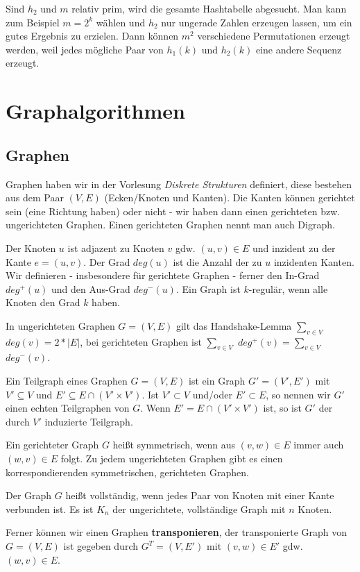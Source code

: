 \documentclass[12pt]{article}
\begin{document}
Sind $h_2$ und $m$ relativ prim, wird die gesamte Hashtabelle abgesucht. Man kann zum Beispiel $m = 2^k$ wählen und $h_2$ nur ungerade Zahlen erzeugen lassen, um ein gutes Ergebnis zu erzielen. Dann können $m^2$ verschiedene Permutationen erzeugt werden, weil jedes mögliche Paar von $h_1(k)$ und $h_2(k)$ eine andere Sequenz erzeugt.

\section{Graphalgorithmen}

\subsection{Graphen}

Graphen haben wir in der Vorlesung \textit{Diskrete Strukturen} definiert, diese bestehen aus dem Paar $(V, E)$ (Ecken/Knoten und Kanten). Die Kanten können gerichtet sein (eine Richtung haben) oder nicht - wir haben dann einen gerichteten bzw. ungerichteten Graphen. Einen gerichteten Graphen nennt man auch Digraph.

Der Knoten $u$ ist adjazent zu Knoten $v$ gdw. $(u,v) \in E$ und inzident zu der Kante $e = (u,v)$. Der Grad $deg(u)$ ist die Anzahl der zu $u$ inzidenten Kanten. Wir definieren - insbesondere für gerichtete Graphen - ferner den In-Grad $deg^+(u)$ und den Aus-Grad $deg^-(u)$. Ein Graph ist $k$-regulär, wenn alle Knoten den Grad $k$ haben.

In ungerichteten Graphen $G = (V, E)$ gilt das Handshake-Lemma $\sum_{v \in V}$ $deg(v) = 2*|E|$, bei gerichteten Graphen ist $\sum_{v \in V}$ $deg^+(v) = \sum_{v \in V}$ $deg^-(v)$.

Ein Teilgraph eines Graphen $G = (V, E)$ ist ein Graph $G' = (V', E')$ mit $V' \subseteq V$ und $E' \subseteq E \cap (V' \times V')$. Ist $V' \subset V$ und/oder $E' \subset E$, so nennen wir $G'$ einen echten Teilgraphen von $G$. Wenn $E' = E \cap (V' \times V')$ ist, so ist $G'$ der durch $V'$ induzierte Teilgraph.

Ein gerichteter Graph $G$ heißt symmetrisch, wenn aus $(v,w) \in E$ immer auch $(w,v) \in E$ folgt. Zu jedem ungerichteten Graphen gibt es einen korrespondierenden symmetrischen, gerichteten Graphen.

Der Graph $G$ heißt vollständig, wenn jedes Paar von Knoten mit einer Kante verbunden ist. Es ist $K_n$ der ungerichtete, vollständige Graph mit $n$ Knoten.

Ferner können wir einen Graphen \textbf{transponieren}, der transponierte Graph von $G = (V, E)$ ist gegeben durch $G^T = (V, E')$ mit $(v, w) \in E'$ gdw. $(w, v) \in E$.
\end{document}
